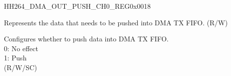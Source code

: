     \begin{register}{H}{H264\_DMA\_OUT\_PUSH\_CH0\_REG}{0x0018}\label{regdesc:H264DMAOUTPUSHCH0REG}
    \regnewline%
    \begin{regdesc}\begin{reglist}
    \label{fielddesc:H264DMAOUTFIFOWDATACH0}\item [H264\_DMA\_OUTFIFO\_WDATA\_CH0] Represents the data that needs to be pushed into DMA TX FIFO. (R/W)
    \label{fielddesc:H264DMAOUTFIFOPUSHCH0}\item [H264\_DMA\_OUTFIFO\_PUSH\_CH0] Configures whether to push data into DMA TX FIFO.\\
    0: No effect\\
    1: Push \\(R/W/SC)
    \end{reglist}\end{regdesc}
    \end{register}
    
